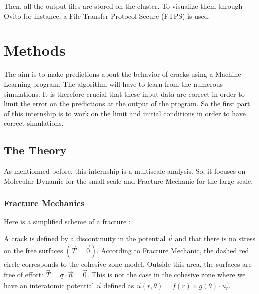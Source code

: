         Then, all the output files are stored on the cluster. To visualize them through Ovito for instance, a File Transfer Protocol Secure (FTPS) is used. 


\section{Methods}

    The aim is to make predictions about the behavior of cracks using a Machine Learning program. The algorithm will have to learn from the numerous simulations. It is therefore crucial that these input data are correct in order to limit the error on the predictions at the output of the program. So the first part of this internship is to work on the limit and initial conditions in order to have correct simulations.

    \subsection{The Theory}

        As mentionned before, this internship is a multiscale analysis. So, it focuses on Molecular Dynamic for the small scale and Fracture Mechanic for the large scale. \medskip

        \subsubsection{Fracture Mechanics}
            Here is a simplified scheme of a fracture : 
                \begin{center}
                    \captionsetup{type=figure}
                \end{center}
            
            A crack is defined by a discontinuity in the potential $\vec{u}$ and that there is no stress on the free surfaces $(\vec{T} = \vec{0})$. According to Fracture Mechanic, the dashed red circle corresponds to the \gls{cohesive zone} model. Outside this area, the surfaces are free of effort: $\vec{T} = \underline{\underline{\sigma}}\cdot\vec{n} = \vec{0}$. This is not the case in the \gls{cohesive zone} where we have an interatomic potential $\vec{u}$ defined as $\vec{u}(r,\theta) = f(r)\times g(\theta)\cdot\vec{u_r}$. \medskip
            
